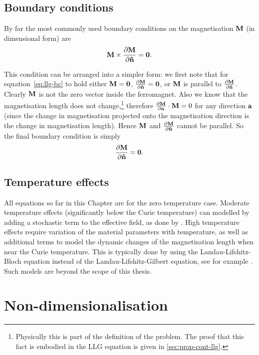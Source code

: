 \subsection{Boundary conditions}
\label{sec:magn-bound-cond}

By far the most commonly used boundary conditions on the magnetisation $\mathbf{M}$ (in dimensional form) are \cite[178, 181]{Aharoni1996}
\begin{equation}
  \label{eq:llg-bc}
  \mathbf{M} \times \frac{\partial \mathbf{M}}{\partial \mathbf{\hat{n}}} = \mathbf{0}.
\end{equation}

This condition can be arranged into a simpler form: we first note that for equation~\cref{eq:llg-bc} to hold either $\mathbf{M} = \mathbf{0}$, $\frac{\partial \mathbf{M}}{\partial \mathbf{\hat{n}}} = \mathbf{0}$, or $\mathbf{M}$ is parallel to $\frac{\partial \mathbf{M}}{\partial \mathbf{\hat{n}}}$.
Clearly $\mathbf{M}$ is not the zero vector inside the ferromagnet.
Also we know that the magnetisation length does not change,\footnote{Physically this is part of the definition of the problem. The proof that this fact is embodied in the LLG equation is given in \cref{sec:prop-cont-llg}.} therefore $\frac{\partial \mathbf{M}}{\partial {\mathbf{a}}} \cdot \mathbf{M} = 0$ for any direction ${\mathbf{a}}$ (since the change in magnetisation projected onto the magnetisation direction is the change in magnetisation length). 
Hence $\mathbf{M}$ and $\frac{\partial \mathbf{M}}{\partial \mathbf{\hat{n}}}$ cannot be parallel.
So the final boundary condition is simply
\begin{equation}
  \frac{\partial \mathbf{M}}{\partial \mathbf{\hat{n}}} = \mathbf{0}.
\end{equation}

\subsection{Temperature effects}
\label{sec:temperature-effects}
All equations so far in this Chapter are for the zero temperature case.
Moderate temperature effects (significantly below the Curie temperature) can modelled by adding a stochastic term to the effective field, as done by \eg \cite{DAquino2006}.
High temperature effects require variation of the material parameters with temperature, as well as additional terms to model the dynamic changes of the magnetisation length when near the Curie temperature.
This is typically done by using the Landau-Lifshitz-Bloch equation instead of the Landau-Lifshitz-Gilbert equation, see for example \cite{Evans2012}.
Such models are beyond the scope of this thesis.


\section{Non-dimensionalisation}
\label{sec:normalisations-appendix}

